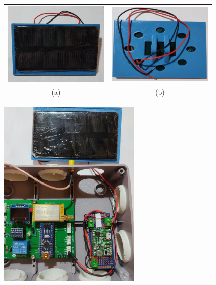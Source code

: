 \documentclass[12pt]{article}
\begin{document}
	\pagebreak
	
	\begin{figure}[h!]
		\begin{center}
			\begin{tabular}{cc}
				\includegraphics[width=50mm]{img/panel_solar_frontal.jpg} &   \includegraphics[width=50mm]{img/panel_solar_trasero.jpg} \\
				(a)  & (b)  \\[6pt]
			\end{tabular}
			\caption{}
			\label{panel solar}
		\end{center}
	\end{figure}
	
	\pagebreak
	
	\begin{figure}[h!]
		\begin{center}
			\includegraphics[width=0.6\textwidth]{img/conglomerado_alimentacion_zoom_1.jpg}
			\caption{}
			\label{}
		\end{center}
	\end{figure}
\end{document}
